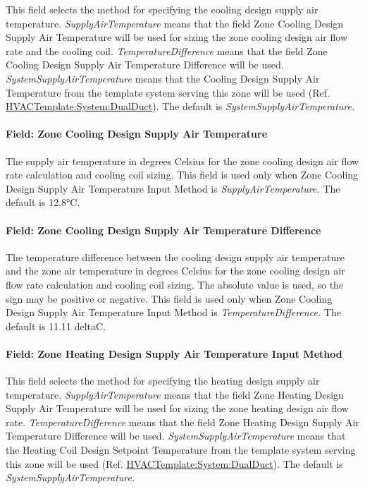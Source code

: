 This field selects the method for specifying the cooling design supply air temperature. \emph{SupplyAirTemperature} means that the field Zone Cooling Design Supply Air Temperature will be used for sizing the zone cooling design air flow rate and the cooling coil. \emph{TemperatureDifference} means that the field Zone Cooling Design Supply Air Temperature Difference will be used. \emph{SystemSupplyAirTemperature} means that the Cooling Design Supply Air Temperature from the template system serving this zone will be used (Ref. \hyperref[hvactemplatesystemdualduct]{HVACTemplate:System:DualDuct}). The default is \emph{SystemSupplyAirTemperature.}

\paragraph{Field: Zone Cooling Design Supply Air Temperature}\label{field-zone-cooling-design-supply-air-temperature-9}

The supply air temperature in degrees Celsius for the zone cooling design air flow rate calculation and cooling coil sizing. This field is used only when Zone Cooling Design Supply Air Temperature Input Method is \emph{SupplyAirTemperature.} The default is 12.8°C.

\paragraph{Field: Zone Cooling Design Supply Air Temperature Difference}\label{field-zone-cooling-design-supply-air-temperature-difference-10}

The temperature difference between the cooling design supply air temperature and the zone air temperature in degrees Celsius for the zone cooling design air flow rate calculation and cooling coil sizing. The absolute value is used, so the sign may be positive or negative. This field is used only when Zone Cooling Design Supply Air Temperature Input Method is \emph{TemperatureDifference.} The default is 11.11 deltaC.

\paragraph{Field: Zone Heating Design Supply Air Temperature Input Method}\label{field-zone-heating-design-supply-air-temperature-input-method-10}

This field selects the method for specifying the heating design supply air temperature. \emph{SupplyAirTemperature} means that the field Zone Heating Design Supply Air Temperature will be used for sizing the zone heating design air flow rate. \emph{TemperatureDifference} means that the field Zone Heating Design Supply Air Temperature Difference will be used. \emph{SystemSupplyAirTemperature} means that the Heating Coil Design Setpoint Temperature from the template system serving this zone will be used (Ref. \hyperref[hvactemplatesystemdualduct]{HVACTemplate:System:DualDuct}). The default is \emph{SystemSupplyAirTemperature.}

